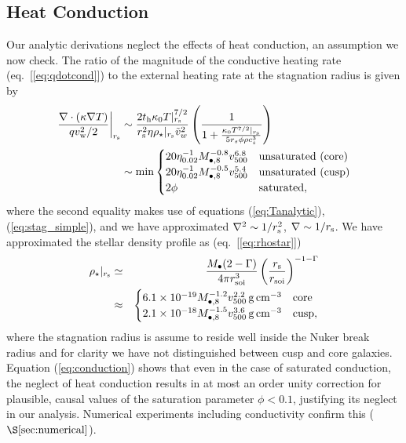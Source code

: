 \documentclass[usenatbib,fleqn]{mn2e}
\newcommand{\rs}{r_s}
\begin{document}
\subsection{Heat Conduction}
\label{sec:conductivity}

Our analytic derivations neglect the effects of heat conduction, an assumption we now check.  The ratio of the magnitude of the conductive heating rate (eq.~[\ref{eq:qdotcond}]) to the external heating rate at the stagnation radius is given by
\begin{align}
  \left.\frac{\nabla\cdot(\kappa \nabla T)}{q v_{\rm
w}^{2}/2}\right|_{r_{\rm s}} &\sim \frac{2t_{\rm h}\kappa_0
T|_{r_{\rm s}}^{7/2}}{r_{\rm s}^{2}\eta \rho_{\star}|_{r_{\rm s}}
\tilde{v}_{w}^{2}}
 \left(\frac{1}{1+\frac{\kappa_0 T^{7/2}|_{r_{\rm s}}}{5 \rs
    \phi \rho c_s^3}}\right)
\nonumber \\ &\sim {\rm min}
  \begin{cases}
  20 \eta_{0.02}^{-1}
M_{\bullet,8}^{-0.8} v_{500}^{6.8} &  \text{unsaturated (core)}\\
 20 \eta_{0.02}^{-1}
M_{\bullet,8}^{-0.5} v_{500}^{5.4} &  \text{unsaturated (cusp)}\\
  2 \phi & \text{saturated},
  \end{cases}
 \label{eq:conduction}
\end{align}
where the second equality makes use of equations (\ref{eq:Tanalytic}),
(\ref{eq:stag_simple}), and we have approximated $\nabla^{2} \sim
1/r_{\rm s}^{2}$, $\nabla \sim 1/r_{\rm s}$.  We have approximated the
stellar density profile as (eq.~[\ref{eq:rhostar}])
\begin{eqnarray}
  \rho_{\star}|_{r_{\rm s}} &\simeq& \frac{M_{\bullet}(2-\Gamma)}{4\pi r_{\rm soi}^{3}}\left(\frac{r_{\rm s}}{r_{\rm soi}}\right)^{-1-\Gamma} \nonumber \\
 &\approx& \begin{cases}
    6.1 \times 10^{-19}M_{\bullet,8}^{-1.2}v_{500}^{2.2}\,{\rm g\,cm^{-3}}
    & \text{core} \\
    2.1 \times 10^{-18} M_{\bullet,8}^{-1.5}v_{500}^{3.6}
    \,{\rm g\,cm^{-3}}  & \text{cusp}, 
  \end{cases}
  \label{eq:rhostarrs}
\end{eqnarray}
where the stagnation radius is assume to reside well inside the Nuker
break radius and for clarity we have not distinguished between cusp
and core galaxies.  Equation (\ref{eq:conduction}) shows that even in
the case of saturated conduction, the neglect of heat conduction
results in at most an order unity correction for plausible, causal values of
the saturation parameter $\phi < 0.1$, justifying its neglect in our
analysis.  Numerical experiments including conductivity confirm this
($\S\ref{sec:numerical}$).
\end{document}
